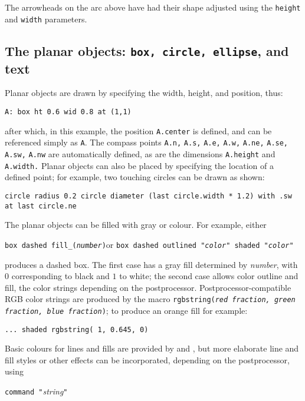 The arrowheads on the arc above have had their shape adjusted using the
{\tt height} and {\tt width} parameters.

\subsection{The planar objects: {\tt box, circle, ellipse}, and text%
\label{Planarobjects:}}
Planar objects are drawn by specifying the width, height, and position, thus:

{\tt A: box ht 0.6 wid 0.8 at (1,1)}

\noindent
after which, in this example, the position {\tt A.center} is defined,
and can be referenced simply as {\tt A}.
The compass points {\tt A.n,} {\tt A.s,} {\tt A.e,} {\tt A.w,} {\tt A.ne,}
{\tt A.se,} {\tt A.sw,} {\tt A.nw} are automatically defined, as are
the dimensions {\tt A.height} and {\tt A.width.}
Planar objects can also be placed by specifying the location of a defined
point; for example, two touching circles can be drawn as shown:

{\tt circle radius 0.2\hfill\break 
\hspace*{\parindent}%
circle diameter (last circle.width * 1.2) with .sw at last circle.ne}

The planar objects can be filled with gray or colour.
For example, either

{\tt box dashed fill\_({\sl number})}\quad or\quad
 {\tt box dashed outlined "{\sl color}" shaded "{\sl color}"}

\noindent
produces a dashed box. The first case has a gray fill determined by
{\sl number}, with $0$ corresponding to black and $1$ to white;
the second case allows color outline and fill, the color strings depending on
the postprocessor.
Postprocessor-compatible RGB color strings are produced by the macro
{\tt rgbstring({\sl red fraction, green fraction, blue fraction})};
to produce an orange fill for example:

{\tt ... shaded rgbstring( 1, 0.645, 0)}

Basic colours for lines and fills are provided by \gpic  and \dpic,
but more elaborate line and fill styles or other effects
can be incorporated, depending on the postprocessor, using

{\tt command "}{\sl string}{\tt "}

